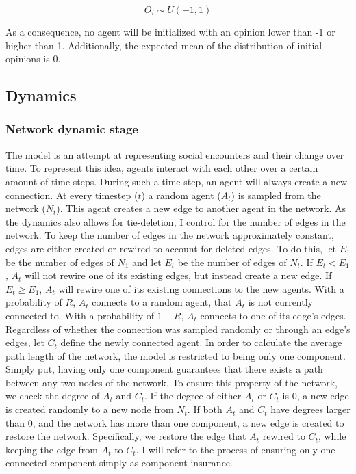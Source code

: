 \documentclass{article}
\begin{document}
$$O_i \sim U(-1, 1)$$

\noindent As a consequence, no agent will be initialized with an opinion lower than -1 or higher than 1. Additionally, the expected mean of the distribution of initial opinions is 0.

\subsection{Dynamics}

\subsubsection{Network dynamic stage }

The model is an attempt at representing social encounters and their change over time. 
To represent this idea, agents interact with each other over a certain amount of time-steps. 
During such a time-step, an agent will always create a new connection. 
At every timestep ($t$) a random agent ($A_t$) is sampled from the network ($N_t$). This agent creates a new edge to another agent in the network. 
As the dynamics also allows for tie-deletion, I control for the number of edges in the network.
To keep the number of edges in the network approximately constant, edges are either created or rewired to account for deleted edges. 
To do this, let $E_1$ be the number of edges of $N_1$ and let $E_t$ be the number of edges of $N_t$. 
If $E_t < E_1$, $A_t$ will not rewire one of its existing edges, but instead create a new edge. If $E_t \geq E_1$, $A_t$ will rewire one of its existing connections to the new agents.
With a probability of $R$, $A_t$ connects to a random agent, that $A_t$ is not currently connected to. 
With a probability of $1-R$, $A_t$ connects to one of its edge's edges. Regardless of whether the connection was sampled randomly or through an edge's edges, let $C_t$ define the newly connected agent. In order to calculate the average path length of the network, the model is restricted to being only one component. 
Simply put, having only one component guarantees that there exists a path between any two nodes of the network.
To ensure this property of the network, we check the degree of $A_t$ and $C_t$. If the degree of either $A_t$ or $C_t$ is 0, a new edge is created randomly to a new node from $N_t$.
If both $A_t$ and $C_t$ have degrees larger than 0, and the network has more than one component, a new edge is created to restore the network. Specifically, we restore the edge that $A_t$ rewired to $C_t$, while keeping the edge from $A_t$ to $C_t$.
I will refer to the process of ensuring only one connected component simply as component insurance. 
\end{document}
